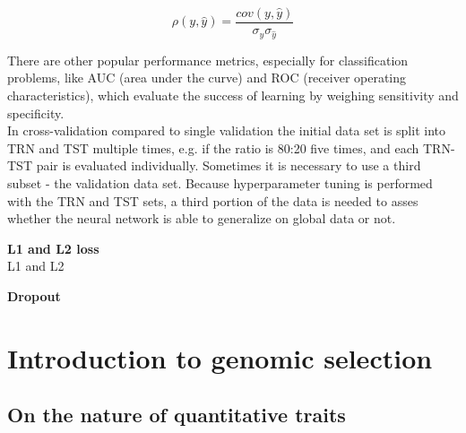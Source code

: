 \begin{equation}
  \rho(y,\hat{y}) = \frac{cov(y,\hat{y})}{ \sigma_y \sigma_{\hat{y}}}
 \label{eqn:pearson}
\end{equation}

There are other popular performance metrics, especially for classification problems, like AUC (area
under the curve) and ROC (receiver operating characteristics), which evaluate the success of
learning by weighing sensitivity and specificity. \\
In cross-validation compared to single validation the initial data set is split into TRN and TST
multiple times, e.g. if the ratio is 80:20 five times, and each TRN-TST pair is evaluated
individually. Sometimes it is necessary to use a third subset - the validation data set. Because
hyperparameter tuning is performed with the TRN and TST sets, a third portion of the data is needed
to asses whether the neural network is able to generalize on global data or not.

\textbf{L1 and L2 loss} \\
 
L1 and L2

\textbf{Dropout}

\section{Introduction to genomic selection}
\subsection{On the nature of quantitative traits} \label{quan}

